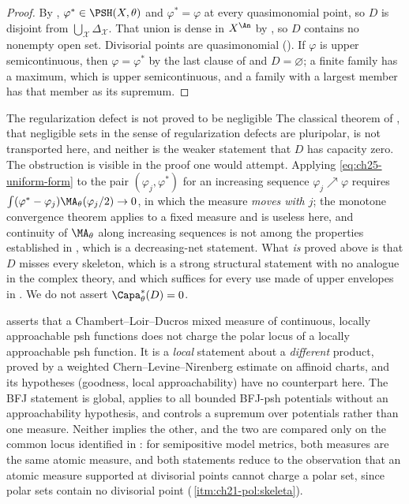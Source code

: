 \begin{proof}
By , \(\varphi^*\in\PSH(X,\theta)\) and
\(\varphi^*=\varphi\) at every quasimonomial point, so \(D\) is disjoint
from \(\bigcup_{\mathcal X}\Delta_{\mathcal X}\).  That union is dense in
\(X^{\An}\) by , so \(D\) contains no
nonempty open set.  Divisorial points are quasimonomial
().  If \(\varphi\) is upper
semicontinuous, then \(\varphi=\varphi^*\) by the last clause of
 and \(D=\varnothing\); a finite family has a
maximum, which is upper semicontinuous, and a family with a largest member
has that member as its supremum.
\end{proof}

\begin{warning}{The regularization defect is not proved to be negligible}
The classical theorem of \cite{BT82}, that negligible sets in the sense of
regularization defects are pluripolar, is not transported here, and neither
is the weaker statement that \(D\) has capacity zero.  The obstruction is
visible in the proof one would attempt.  Applying
\eqref{eq:ch25-uniform-form} to the pair \((\varphi_j,\varphi^*)\) for an
increasing sequence \(\varphi_j\nearrow\varphi\) requires
\(\int(\varphi^*-\varphi_j)\MA_\theta(\varphi_j/2)\to0\), in which the
measure \emph{moves with \(j\)}; the monotone convergence theorem
 applies to a fixed measure and is
useless here, and continuity of \(\MA_\theta\) along increasing sequences is
not among the properties established in ,
which is a decreasing-net statement.  What \emph{is} proved above is that
\(D\) misses every skeleton, which is a strong structural statement with no
analogue in the complex theory, and which suffices for every use made of
upper envelopes in .  We do not assert
\(\Capa^*_\theta(D)=0\).
\end{warning}

\begin{remark}
\label{rem:ch25-cld-comparison}
 asserts that a Chambert--Loir--Ducros
mixed measure of continuous, locally approachable psh functions does not
charge the polar locus of a locally approachable psh function.  It is a
\emph{local} statement about a \emph{different} product, proved by a weighted
Chern--Levine--Nirenberg estimate on affinoid charts, and its hypotheses
(goodness, local approachability) have no counterpart here.  The BFJ
statement  is global, applies to all bounded
BFJ-psh potentials without an approachability hypothesis, and controls a
supremum over potentials rather than one measure.  Neither implies the other,
and the two are compared only on the common locus identified in
: for semipositive model metrics, both
measures are the same atomic measure, and both statements reduce to the
observation that an atomic measure supported at divisorial points cannot
charge a polar set, since polar sets contain no divisorial point
(\,\cref{itm:ch21-pol:skeleta}).
\end{remark}

